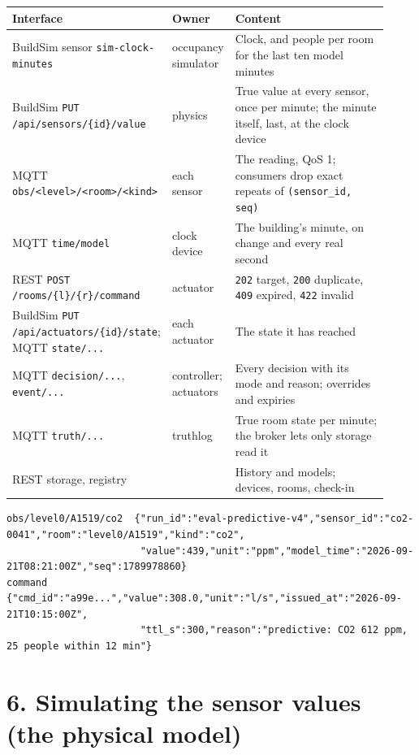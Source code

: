 \documentclass[11pt]{article}
\begin{document}
\begin{longtable}[]{@{}>{\raggedright\arraybackslash}p{0.27\linewidth}>{\raggedright\arraybackslash}p{0.13\linewidth}>{\raggedright\arraybackslash}p{0.52\linewidth}@{}}
\toprule
\textbf{Interface} & \textbf{Owner} & \textbf{Content} \\
\midrule
\endhead
BuildSim sensor \texttt{sim-clock-minutes} & occupancy simulator & Clock, and people per room for the last ten model minutes \\
BuildSim \texttt{PUT /api/sensors/\{id\}/value} & physics & True value at every sensor, once per minute; the minute itself, last, at the clock device \\
MQTT \texttt{obs/<level>/<room>/<kind>} & each sensor & The reading, QoS 1; consumers drop exact repeats of \texttt{(sensor\_id, seq)} \\
MQTT \texttt{time/model} & clock device & The building's minute, on change and every real second \\
REST \texttt{POST /rooms/\{l\}/\{r\}/command} & actuator & \texttt{202} target, \texttt{200} duplicate, \texttt{409} expired, \texttt{422} invalid \\
BuildSim \texttt{PUT /api/actuators/\{id\}/state}; MQTT \texttt{state/...} & each actuator & The state it has reached \\
MQTT \texttt{decision/...}, \texttt{event/...} & controller; actuators & Every decision with its mode and reason; overrides and expiries \\
MQTT \texttt{truth/...} & truthlog & True room state per minute; the broker lets only storage read it \\
REST storage, registry & & History and models; devices, rooms, check-in \\
\bottomrule
\end{longtable}

{\scriptsize\begin{verbatim}
obs/level0/A1519/co2  {"run_id":"eval-predictive-v4","sensor_id":"co2-0041","room":"level0/A1519","kind":"co2",
                       "value":439,"unit":"ppm","model_time":"2026-09-21T08:21:00Z","seq":1789978860}
command               {"cmd_id":"a99e...","value":308.0,"unit":"l/s","issued_at":"2026-09-21T10:15:00Z",
                       "ttl_s":300,"reason":"predictive: CO2 612 ppm, 25 people within 12 min"}
\end{verbatim}}

\section{6. Simulating the sensor values (the physical model)}
\end{document}
